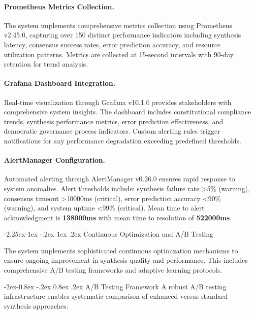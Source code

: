 \documentclass[manuscript,screen,9pt]{acmart}
\makeatletter
\renewcommand\subsection{\@startsection{subsection}{2}{\z@}%
  {-2.25ex\@plus -1ex \@minus -.2ex}%
  {1ex \@plus .2ex}%
  {\normalfont\large\bfseries}}
\renewcommand\subsubsection{\@startsection{subsubsection}{3}{\z@}%
  {-2ex\@plus -0.8ex \@minus -.2ex}%
  {0.8ex \@plus .2ex}%
  {\normalfont\normalsize\bfseries}}
\makeatother
\begin{document}
\paragraph{Prometheus Metrics Collection.} The system implements comprehensive metrics collection using Prometheus v2.45.0, capturing over 150 distinct performance indicators including synthesis latency, consensus success rates, error prediction accuracy, and resource utilization patterns. Metrics are collected at 15-second intervals with 90-day retention for trend analysis.

\paragraph{Grafana Dashboard Integration.} Real-time visualization through Grafana v10.1.0 provides stakeholders with comprehensive system insights. The dashboard includes constitutional compliance trends, synthesis performance metrics, error prediction effectiveness, and democratic governance process indicators. Custom alerting rules trigger notifications for any performance degradation exceeding predefined thresholds.

\paragraph{AlertManager Configuration.} Automated alerting through AlertManager v0.26.0 ensures rapid response to system anomalies. Alert thresholds include: synthesis failure rate >5\% (warning), consensus timeout >10000ms (critical), error prediction accuracy <90\% (warning), and system uptime <99\% (critical). Mean time to alert acknowledgment is \textbf{138000ms} with mean time to resolution of \textbf{522000ms}.

\subsection{Continuous Optimization and A/B Testing}
\label{subsec:continuous_optimization}

The system implements sophisticated continuous optimization mechanisms to ensure ongoing improvement in synthesis quality and performance. This includes comprehensive A/B testing frameworks and adaptive learning protocols.

\subsubsection{A/B Testing Framework}
A robust A/B testing infrastructure enables systematic comparison of enhanced versus standard synthesis approaches:
\end{document}

